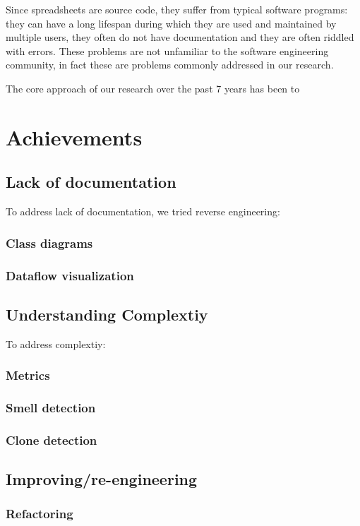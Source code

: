 \documentclass[conference]{IEEEtran}
\begin{document}
Since spreadsheets are source code, they suffer from typical software programs: they can have a long lifespan during which they are used and maintained by multiple users, they often do not have documentation and they are often riddled with errors. These problems are not unfamiliar to the software engineering community, in fact these are problems commonly addressed in our research. 

The core approach of our research over the past 7 years has been to 


\section{Achievements} 

\subsection{Lack of documentation} 

To address lack of documentation, we tried reverse engineering:
\subsubsection{Class diagrams}
\subsubsection{Dataflow visualization}

\subsection{Understanding Complextiy} 
To address complextiy:

\subsubsection{Metrics}
\subsubsection{Smell detection}
\subsubsection{Clone detection}

\subsection{Improving/re-engineering}
\subsubsection{Refactoring}
\end{document}
